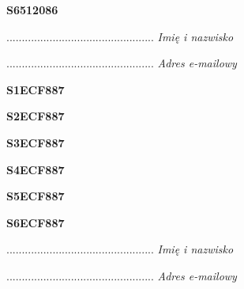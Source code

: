 \begin{turn}{90}\huge \textbf{S6512086}\end{turn}

\begin{turn}{90}\begin{minipage}{\linewidth} \vspace{20mm} ................................................  \textit{Imię i nazwisko}\end{minipage}\end{turn}

\begin{turn}{90}\begin{minipage}{\linewidth} \vspace{20mm} ................................................  \textit{Adres e-mailowy}\end{minipage}\end{turn}

\begin{turn}{90}\huge \textbf{S1ECF887}\end{turn}

\begin{turn}{90}\huge \textbf{S2ECF887}\end{turn}

\begin{turn}{90}\huge \textbf{S3ECF887}\end{turn}

\begin{turn}{90}\huge \textbf{S4ECF887}\end{turn}

\begin{turn}{90}\huge \textbf{S5ECF887}\end{turn}

\begin{turn}{90}\huge \textbf{S6ECF887}\end{turn}

\begin{turn}{90}\begin{minipage}{\linewidth} \vspace{20mm} ................................................  \textit{Imię i nazwisko}\end{minipage}\end{turn}

\begin{turn}{90}\begin{minipage}{\linewidth} \vspace{20mm} ................................................  \textit{Adres e-mailowy}\end{minipage}\end{turn}

